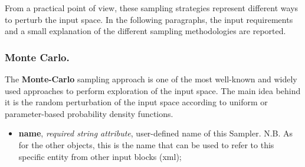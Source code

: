 From a practical point of view, these sampling strategies represent different
ways to perturb the input space.
%
In the following paragraphs, the input requirements and a small explanation of
the different sampling methodologies are reported.

\subsubsection{Monte Carlo.}
\label{subsubsubsec:MC}
The \textbf{Monte-Carlo} sampling approach is one of the most well-known and
widely used approaches to perform exploration of the input space.
%
The main idea behind it is the random perturbation of the input space according
to uniform or parameter-based probability density functions.
%

%
\attrsIntro
\vspace{-5mm}
\begin{itemize}
\itemsep0em
\item \textbf{name}, \textit{required string attribute}, user-defined name of this Sampler. N.B. As for the other objects, this is the name that can be used to refer to this specific entity from other input blocks (xml);
\end{itemize}
\vspace{-5mm}

